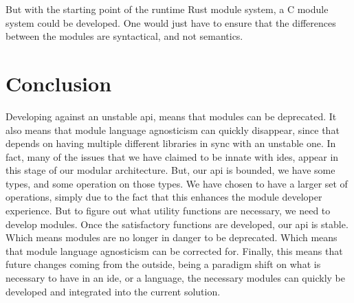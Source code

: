 But with the starting point of the runtime Rust module system, a C module system
could be developed. One would just have to ensure that the differences between
the modules are syntactical, and not semantics.


\section{Conclusion} \label{sec:conclusion}

Developing against an unstable \gls*{api}, means that modules can be
deprecated. It also means that module language agnosticism can quickly
disappear, since that depends on having multiple different libraries in sync
with an unstable one. In fact, many of the issues that we have claimed to be
innate with \gls*{ide}s, appear in this stage of our modular architecture. But,
our \gls*{api} is bounded, we have some types, and some operation on those
types. We have chosen to have a larger set of operations, simply due to the
fact that this enhances the module developer experience. But to figure out what
utility functions are necessary, we need to develop modules. Once the
satisfactory functions are developed, our \gls*{api} is stable. Which means
modules are no longer in danger to be deprecated. Which means that module
language agnosticism can be corrected for. Finally, this means that future
changes coming from the outside, being a paradigm shift on what is necessary to
have in an \gls*{ide}, or a language, the necessary modules can quickly be
developed and integrated into the current solution.

